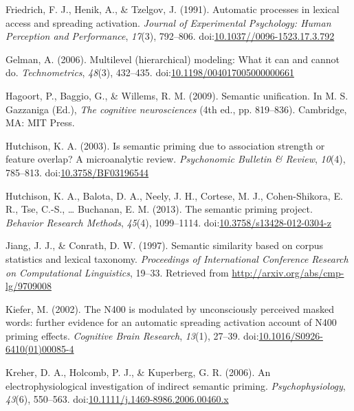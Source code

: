 \documentclass[english,man]{apa6}
\theoremstyle{definition}
\theoremstyle{definition}
\theoremstyle{definition}
\theoremstyle{remark}
\begin{document}
\hypertarget{ref-Friedrich1991}{}
Friedrich, F. J., Henik, A., \& Tzelgov, J. (1991). Automatic processes
in lexical access and spreading activation. \emph{Journal of
Experimental Psychology: Human Perception and Performance},
\emph{17}(3), 792--806.
doi:\href{https://doi.org/10.1037//0096-1523.17.3.792}{10.1037//0096-1523.17.3.792}

\hypertarget{ref-Gelman2006}{}
Gelman, A. (2006). Multilevel (hierarchical) modeling: What it can and
cannot do. \emph{Technometrics}, \emph{48}(3), 432--435.
doi:\href{https://doi.org/10.1198/004017005000000661}{10.1198/004017005000000661}

\hypertarget{ref-Hagoort2009}{}
Hagoort, P., Baggio, G., \& Willems, R. M. (2009). Semantic unification.
In M. S. Gazzaniga (Ed.), \emph{The cognitive neurosciences} (4th ed.,
pp. 819--836). Cambridge, MA: MIT Press.

\hypertarget{ref-Hutchison2003}{}
Hutchison, K. A. (2003). Is semantic priming due to association strength
or feature overlap? A microanalytic review. \emph{Psychonomic Bulletin
\& Review}, \emph{10}(4), 785--813.
doi:\href{https://doi.org/10.3758/BF03196544}{10.3758/BF03196544}

\hypertarget{ref-Hutchison2013}{}
Hutchison, K. A., Balota, D. A., Neely, J. H., Cortese, M. J.,
Cohen-Shikora, E. R., Tse, C.-S., \ldots{} Buchanan, E. M. (2013). The
semantic priming project. \emph{Behavior Research Methods},
\emph{45}(4), 1099--1114.
doi:\href{https://doi.org/10.3758/s13428-012-0304-z}{10.3758/s13428-012-0304-z}

\hypertarget{ref-Jiang1997}{}
Jiang, J. J., \& Conrath, D. W. (1997). Semantic similarity based on
corpus statistics and lexical taxonomy. \emph{Proceedings of
International Conference Research on Computational Linguistics}, 19--33.
Retrieved from \url{http://arxiv.org/abs/cmp-lg/9709008}

\hypertarget{ref-Kiefer2002}{}
Kiefer, M. (2002). The N400 is modulated by unconsciously perceived
masked words: further evidence for an automatic spreading activation
account of N400 priming effects. \emph{Cognitive Brain Research},
\emph{13}(1), 27--39.
doi:\href{https://doi.org/10.1016/S0926-6410(01)00085-4}{10.1016/S0926-6410(01)00085-4}

\hypertarget{ref-Kreher2006}{}
Kreher, D. A., Holcomb, P. J., \& Kuperberg, G. R. (2006). An
electrophysiological investigation of indirect semantic priming.
\emph{Psychophysiology}, \emph{43}(6), 550--563.
doi:\href{https://doi.org/10.1111/j.1469-8986.2006.00460.x}{10.1111/j.1469-8986.2006.00460.x}
\end{document}
